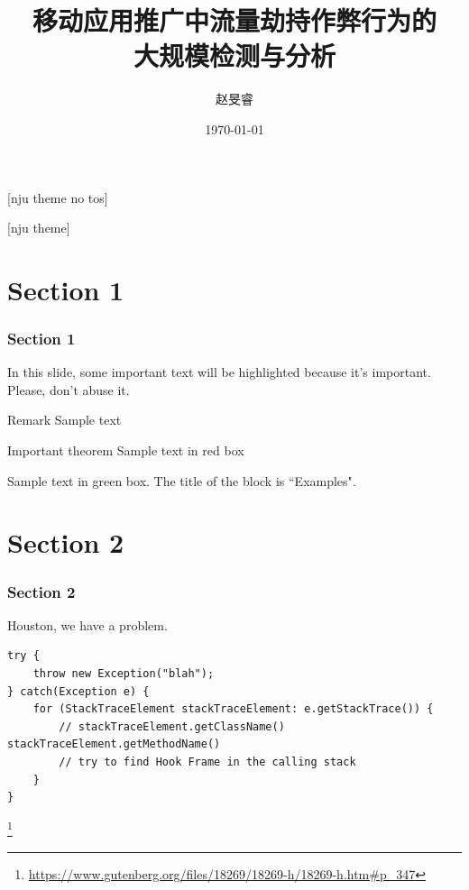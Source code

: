 \documentclass[10pt,aspectratio=169,mathserif]{beamer}
\title[]{移动应用推广中流量劫持作弊行为的\\大规模检测与分析}
\subtitle{}
\author[]{赵旻睿}
\institute[COSEC]{南京大学网络合作与安全研究中心}
\date{\today}
\newcommand\blfootnote[1]{%
\begingroup
\renewcommand\thefootnote{}\footnote{#1}%
\addtocounter{footnote}{-1}%
\endgroup
}
\newcommand{\nologo}{\setbeamertemplate{logo}{}}    %
\begin{document}
[nju theme no tos]
\frame{\titlepage}

\nologo
{}[nju theme]


\section{Section 1}
\begin{frame}
  \frametitle{Section 1}

    In this slide, some important text will be
    \alert{highlighted} because it's important.
    Please, don't abuse it.

    \begin{block}{Remark}
      Sample text
    \end{block}

    \begin{alertblock}{Important theorem}
      Sample text in red box
    \end{alertblock}

    \begin{examples}
      Sample text in green box. The title of the block is ``Examples".
    \end{examples}

\end{frame}

\section{Section 2}
\begin{frame}[fragile]      %
  \frametitle{Section 2}

    Houston, we have a problem.

    \vspace*{10pt}

    \begin{verbatim}
try {
    throw new Exception("blah");
} catch(Exception e) {
    for (StackTraceElement stackTraceElement: e.getStackTrace()) {
        // stackTraceElement.getClassName() stackTraceElement.getMethodName()
        // try to find Hook Frame in the calling stack
    }
}
    \end{verbatim}

    \blfootnote{\tiny \url{https://www.gutenberg.org/files/18269/18269-h/18269-h.htm\#p_347}}

\end{frame}
\end{document}
